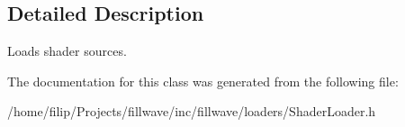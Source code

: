\subsection{Detailed Description}
Loads shader sources. 

The documentation for this class was generated from the following file\+:\begin{DoxyCompactItemize}
\item 
/home/filip/\+Projects/fillwave/inc/fillwave/loaders/Shader\+Loader.\+h\end{DoxyCompactItemize}

